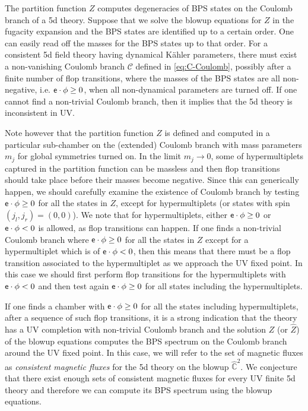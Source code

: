 The partition function $Z$ computes degeneracies of BPS states on the Coulomb branch of a  5d theory. Suppose that we solve the blowup equations for $Z$ in the fugacity expansion and the BPS states are identified up to a certain order. One can easily read off the masses for the BPS states up to that order. For a consistent 5d field theory having dynamical K\"ahler parameters, there must exist a non-vanishing Coulomb branch $\mathcal{C}$ defined in \eqref{eq:C-Coulomb}, possibly after a finite number of flop transitions, where the masses of the BPS states are all non-negative, i.e. ${\sf e}\cdot\phi\ge0$, when all non-dynamical parameters are turned off. If one cannot find a non-trivial Coulomb branch, then it implies that the 5d theory is inconsistent in UV.

Note however that the partition function $Z$ is defined and computed in a particular sub-chamber on the (extended) Coulomb branch with mass parameters $m_j$ for global symmetries turned on. In the limit $m_j\rightarrow0$, some of hypermultiplets captured in the partition function can be massless and then flop transitions should take place before their masses become negative. Since this can generically happen, we should carefully examine the existence of Coulomb branch by testing ${\sf e}\cdot\phi\ge0$ for all the states in $Z$, except for hypermultiplets (or states with spin $(j_l,j_r)=(0,0)$). We note that for hypermultiplets, either ${\sf e}\cdot\phi \ge 0$ or ${\sf e}\cdot\phi< 0$ is allowed, as flop transitions can happen. If one finds a non-trivial Coulomb branch where ${\sf e}\cdot\phi\ge0$ for all the states in $Z$ except for a hypermultiplet which is of ${\sf e}\cdot\phi < 0$, then this means that there must be a flop transition associated to the hypermultiplet as we approach the UV fixed point. In this case we should first perform flop transitions for the hypermultiplets with ${\sf e}\cdot\phi < 0$ and then test again ${\sf e}\cdot\phi\ge0$ for all states including the hypermultiplets.

If one finds a chamber with ${\sf e}\cdot\phi\ge0$ for all the states including hypermultiplets, after a sequence of such flop transitions, it is a strong indication that the theory has a UV completion with non-trivial Coulomb branch and the solution $Z$ (or $\hat{Z}$) of the blowup equations computes the BPS spectrum on the Coulomb branch around the UV fixed point. In this case, we will refer to the set of magnetic fluxes as {\it consistent magnetic fluxes} for the 5d theory on the blowup $\hat{\mathbb{C}}^2$. We conjecture that there exist enough sets of consistent magnetic fluxes for every UV finite 5d theory and therefore we can compute its BPS spectrum using the blowup equations.

